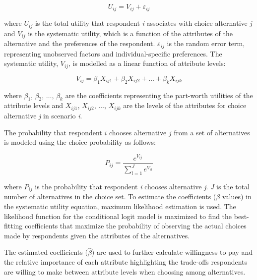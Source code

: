 \documentclass[3p,12pt ]{elsarticle}
\begin{document}
\begin{equation}
U_{ij} = V_{ij} + \varepsilon_{ij}
\end{equation}

\noindent where $U_{ij}$ is the total utility that respondent \textit{i} associates with choice alternative \textit{j} and $V_{ij}$ is the systematic utility, which is a function of the attributes of the alternative and the preferences of the respondent.
$\varepsilon_{ij}$ is the random error term, representing unobserved factors and individual-specific preferences.
The systematic utility, \( V_{ij} \), is modelled as a linear function of attribute levels:

\begin{equation}
V_{ij} = \beta_1 X_{ij1} + \beta_2 X_{ij2} + \ldots + \beta_k X_{ijk}
\end{equation}

\noindent where $\beta_1$, $\beta_2$, $\ldots$, $\beta_k$  are the coefficients representing the part-worth utilities of the attribute levels and $X_{ij1}$, $X_{ij2}$, $\ldots$, $X_{ijk}$ are the levels of the attributes for choice alternative \textit{j} in scenario \textit{i}.

\vspace{2mm}

\noindent The probability that respondent \( i \) chooses alternative \( j \) from a set of alternatives is modeled using the choice probability as follows:

\begin{equation}
P_{ij} = \frac{e^{V_{ij}}}{\sum_{l=1}^{J} e^{V_{il}}}
\end{equation}

\noindent where $P_{ij}$  is the probability that respondent \textit{i} chooses alternative \textit{j}.
\textit{J} is the total number of alternatives in the choice set.
To estimate the coefficients (\( \beta \) values) in the systematic utility equation, maximum likelihood estimation is used.
The likelihood function for the conditional logit model is maximized to find the best-fitting coefficients that maximize the probability of observing the actual choices made by respondents given the attributes of the alternatives.

The estimated coefficients (\( \hat{\beta} \)) are used to further calculate willingness to pay and the relative importance of each attribute highlighting the trade-offs respondents are willing to make between attribute levels when choosing among alternatives.
\end{document}
